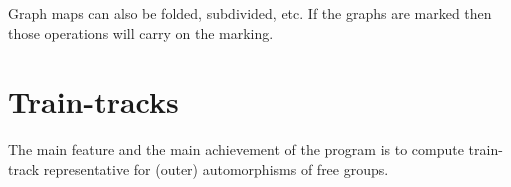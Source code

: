 \documentclass[10pt,a4paper]{article}
\begin{document}
Graph maps can also be folded, subdivided, etc. If the graphs are
marked then those operations will carry on the marking.

\section{Train-tracks}

The main feature and the main achievement of the program is to compute
train-track representative for (outer) automorphisms of free groups.
\end{document}
